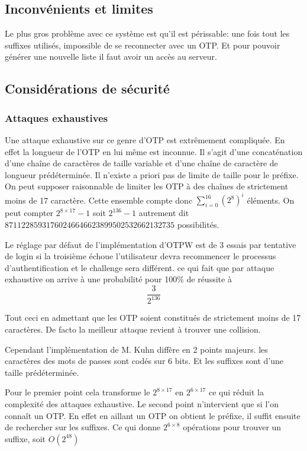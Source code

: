 \documentclass{../res/univ-projet}
\begin{document}
\subsection{Inconvénients et limites}
        Le plus gros problème avec ce système est qu'il est périssable: une fois tout les
    suffixes utilisés, impossible de se reconnecter avec un OTP. Et pour pouvoir générer
    une nouvelle liste il faut avoir un accès au serveur.

\subsection{Considérations de sécurité}
\subsubsection{Attaques exhaustives} %
        Une attaque exhaustive sur ce genre d'OTP est extrêmement compliquée.
    En effet la longueur de l'OTP en lui même est inconnue. Il s'agit d'une
    concaténation d'une chaîne de caractères de taille variable et d'une chaîne
    de caractère de longueur prédéterminée. Il n'existe a priori pas de limite
    de taille pour le préfixe. On peut supposer raisonnable de limiter les
    OTP à des chaînes de strictement moins de 17 caractère.
    Cette ensemble compte donc $\sum_{i=0}^{16}(2^8)^i$ éléments.
    On peut compter  $2^{8\times 17} - 1$ soit $2^136 -1$ autrement dit
    $87112285931760246646623899502532662132735$ possibilités.

        Le réglage par défaut de l'implémentation d'OTPW est de 3 essais par tentative de login
    si la troisième échoue l'utilisateur devra recommencer le processus d'authentification
    et le challenge sera différent. ce qui fait que par attaque exhaustive on arrive à
    une probabilité pour 100\% de réussite à
    \[\frac{3}{2^{136}}\]

        Tout ceci en admettant que les OTP soient constitués de strictement moins
    de 17 caractères. De facto la meilleur attaque revient à trouver une collision.
    
        Cependant l'implémentation de M. Kuhn diffère en 2 points majeurs. les caractères des mots
    de passes sont codés sur 6 bits. Et les suffixes sont d'une taille prédéterminée.
    
        Pour le premier point cela transforme le $2^{8\times 17}$ en $2^{6\times 17}$ ce qui réduit
    la complexité des attaques exhaustive. Le second point n'intervient que si l'on connaît un OTP.
    En effet en aillant un OTP on obtient le préfixe, il suffit ensuite de rechercher sur les suffixes.
    Ce qui donne $2^{6\times 8}$ opérations pour trouver un suffixe, soit $O(2^48)$
    
\end{document}
